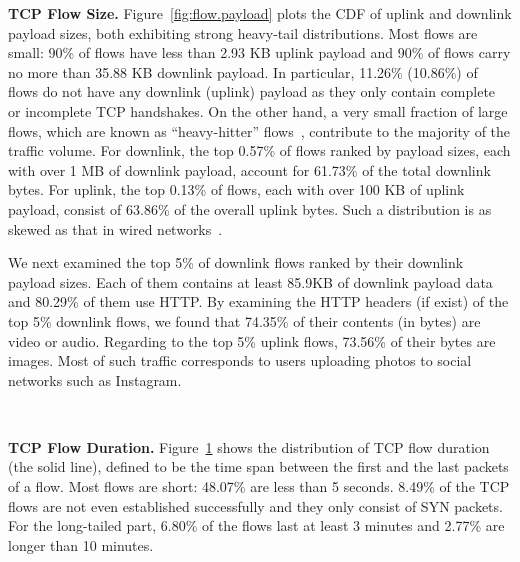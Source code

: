 \textbf{TCP Flow Size.}
Figure~\ref{fig:flow.payload} plots the CDF of uplink and downlink payload sizes, both exhibiting strong heavy-tail distributions. Most flows are small: 90\% of flows have less than 2.93 KB uplink payload and 90\% of flows carry no more than 35.88 KB downlink payload. In particular, 11.26\% (10.86\%) of flows do not have any downlink (uplink) payload as they only contain complete or incomplete TCP handshakes. On the other hand, a very small fraction of large flows, which are known as ``heavy-hitter'' flows~\cite{qian09}, contribute to the majority of the traffic volume. For downlink, the top 0.57\% of flows ranked by payload sizes, each with over 1 MB of downlink payload, account for 61.73\% of the total downlink bytes. For uplink, the top 0.13\% of flows, each with over 100 KB of uplink payload, consist of 63.86\% of the overall uplink bytes. Such a distribution is as skewed as that in wired networks~\cite{qian09}.

We next examined the top 5\% of downlink flows ranked by their downlink payload sizes. Each of them contains at least 85.9KB of downlink payload data and 80.29\% of them use HTTP. By examining the HTTP headers (if exist) of the top 5\% downlink flows, we found that 74.35\% of their contents (in bytes) are video or audio. Regarding to the top 5\% uplink flows, 73.56\% of their bytes are images. Most of such traffic corresponds to users uploading photos to social networks such as Instagram.



\begin{figure}[t]
\centering
{}\\
\label{fig:flow.duration}
\end{figure}

\textbf{TCP Flow Duration.}
Figure~\ref{fig:flow.duration} shows the distribution of TCP flow duration (the solid line), defined to be the time span between the first and the last packets of a flow. Most flows are short: 48.07\% are less than 5 seconds. 8.49\% of the TCP flows are not even established successfully and they only consist of SYN packets. For the long-tailed part, 6.80\% of the flows last at least 3 minutes and 2.77\% are longer than 10 minutes.

